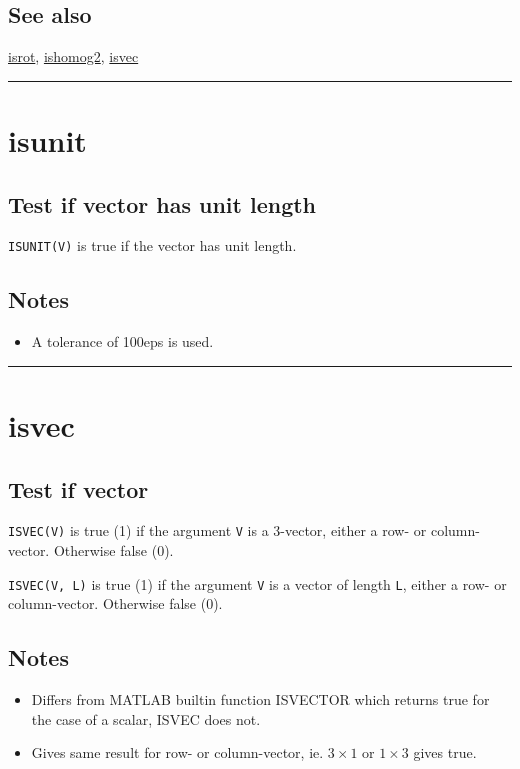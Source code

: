\subsection*{See also}


\hyperlink{isrot}{\color{blue} isrot}, \hyperlink{ishomog2}{\color{blue} ishomog2}, \hyperlink{isvec}{\color{blue} isvec}

\vspace{1.5ex}\rule{\textwidth}{1mm}

\hypertarget{isunit}{\section*{isunit}}
\subsection*{Test if vector has unit length}


\texttt{ISUNIT(V)} is true if the vector has unit length.


\subsection*{Notes}
\begin{itemize}
  \item A tolerance of 100eps is used.
\end{itemize}
\vspace{1.5ex}\rule{\textwidth}{1mm}

\hypertarget{isvec}{\section*{isvec}}
\subsection*{Test if vector}


\texttt{ISVEC(V)} is true (1) if the argument \texttt{V} is a 3-vector, either a
row- or column-vector.  Otherwise false (0).



\texttt{ISVEC(V, L)} is true (1) if the argument \texttt{V} is a vector of length \texttt{L},
either a row- or column-vector.  Otherwise false (0).


\subsection*{Notes}
\begin{itemize}
  \item Differs from MATLAB builtin function ISVECTOR which returns true    for the case of a scalar, ISVEC does not.
  \item Gives same result for row- or column-vector, ie. $3 \times 1$ or $1 \times 3$ gives true.
\end{itemize}

